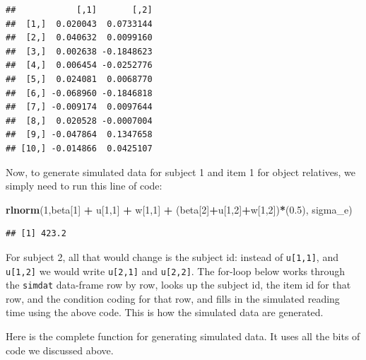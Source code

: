 \documentclass[12pt,]{krantz}
\newenvironment{Shaded}{\begin{snugshade}}{\end{snugshade}}
\newcommand{\DecValTok}[1]{\textcolor[rgb]{0.00,0.00,0.81}{#1}}
\newcommand{\FloatTok}[1]{\textcolor[rgb]{0.00,0.00,0.81}{#1}}
\newcommand{\KeywordTok}[1]{\textcolor[rgb]{0.13,0.29,0.53}{\textbf{#1}}}
\newcommand{\NormalTok}[1]{#1}
\newcommand{\OperatorTok}[1]{\textcolor[rgb]{0.81,0.36,0.00}{\textbf{#1}}}
\newcommand{\StringTok}[1]{\textcolor[rgb]{0.31,0.60,0.02}{#1}}
\begin{document}
\begin{verbatim}
##            [,1]       [,2]
##  [1,]  0.020043  0.0733144
##  [2,]  0.040632  0.0099160
##  [3,]  0.002638 -0.1848623
##  [4,]  0.006454 -0.0252776
##  [5,]  0.024081  0.0068770
##  [6,] -0.068960 -0.1846818
##  [7,] -0.009174  0.0097644
##  [8,]  0.020528 -0.0007004
##  [9,] -0.047864  0.1347658
## [10,] -0.014866  0.0425107
\end{verbatim}

Now, to generate simulated data for subject 1 and item 1 for object relatives, we simply need to run this line of code:

\begin{Shaded}
\begin{Highlighting}[]
\KeywordTok{rlnorm}\NormalTok{(}\DecValTok{1}\NormalTok{,beta[}\DecValTok{1}\NormalTok{] }\OperatorTok{+}\StringTok{    }\NormalTok{u[}\DecValTok{1}\NormalTok{,}\DecValTok{1}\NormalTok{] }\OperatorTok{+}\StringTok{ }\NormalTok{w[}\DecValTok{1}\NormalTok{,}\DecValTok{1}\NormalTok{] }\OperatorTok{+}\StringTok{ }
\StringTok{         }\NormalTok{(beta[}\DecValTok{2}\NormalTok{]}\OperatorTok{+}\NormalTok{u[}\DecValTok{1}\NormalTok{,}\DecValTok{2}\NormalTok{]}\OperatorTok{+}\NormalTok{w[}\DecValTok{1}\NormalTok{,}\DecValTok{2}\NormalTok{])}\OperatorTok{*}\NormalTok{(}\FloatTok{0.5}\NormalTok{),}
\NormalTok{                   sigma_e) }
\end{Highlighting}
\end{Shaded}

\begin{verbatim}
## [1] 423.2
\end{verbatim}

For subject 2, all that would change is the subject id: instead of \texttt{u{[}1,1{]}}, and \texttt{u{[}1,2{]}} we would write \texttt{u{[}2,1{]}} and \texttt{u{[}2,2{]}}. The for-loop below works through the \texttt{simdat} data-frame row by row, looks up the subject id, the item id for that row, and the condition coding for that row, and fills in the simulated reading time using the above code. This is how the simulated data are generated.

Here is the complete function for generating simulated data. It uses all the bits of code we discussed above.
\end{document}
